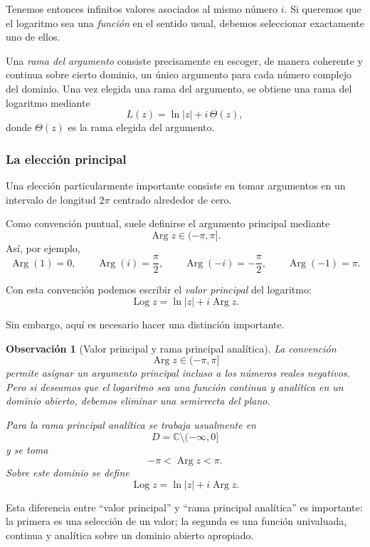 \documentclass[12pt]{article}
\DeclareMathOperator{\Arg}{Arg}
\DeclareMathOperator{\Log}{Log}
\newtheorem{Obs}{Observaci\'on}[section]
\begin{document}
Tenemos entonces infinitos valores asociados al mismo número $i$. Si queremos
que el logaritmo sea una \emph{función} en el sentido usual, debemos seleccionar
exactamente uno de ellos.

Una \emph{rama del argumento} consiste precisamente en escoger, de manera
coherente y continua sobre cierto dominio, un único argumento para cada número
complejo del dominio. Una vez elegida una rama del argumento, se obtiene una
rama del logaritmo mediante
\[
L(z)=\ln|z|+i\,\Theta(z),
\]
donde $\Theta(z)$ es la rama elegida del argumento.

\subsubsection*{La elección principal}

Una elección particularmente importante consiste en tomar argumentos en un
intervalo de longitud $2\pi$ centrado alrededor de cero.

Como convención puntual, suele definirse el argumento principal mediante
\[
\operatorname{Arg}z\in(-\pi,\pi].
\]
Así, por ejemplo,
\[
\operatorname{Arg}(1)=0,\qquad
\operatorname{Arg}(i)=\frac{\pi}{2},\qquad
\operatorname{Arg}(-i)=-\frac{\pi}{2},\qquad
\operatorname{Arg}(-1)=\pi.
\]

Con esta convención podemos escribir el \emph{valor principal} del logaritmo:
\[
\boxed{
\operatorname{Log}z
=
\ln|z|+i\operatorname{Arg}z.
}
\]

Sin embargo, aquí es necesario hacer una distinción importante.

\begin{Obs}[Valor principal y rama principal analítica]
La convención
\[
\operatorname{Arg}z\in(-\pi,\pi]
\]
permite asignar un argumento principal incluso a los números reales negativos.
Pero si deseamos que el logaritmo sea una función continua y analítica en un
dominio abierto, debemos eliminar una semirrecta del plano.

Para la \emph{rama principal analítica} se trabaja usualmente en
\[
\boxed{
D=\mathbb C\setminus(-\infty,0]
}
\]
y se toma
\[
\boxed{
-\pi<\Arg z<\pi.
}
\]
Sobre este dominio se define
\[
\boxed{
\Log z=\ln|z|+i\Arg z.
}
\]
\end{Obs}

Esta diferencia entre ``valor principal'' y ``rama principal analítica'' es
importante: la primera es una selección de un valor; la segunda es una función
univaluada, continua y analítica sobre un dominio abierto apropiado.
\end{document}
